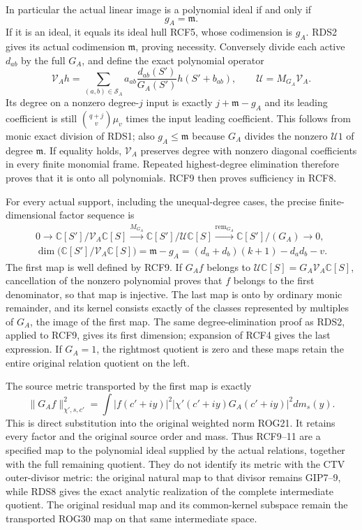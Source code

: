 \documentclass[11pt,a4paper]{article}
\begin{document}
In particular the actual linear image is a polynomial ideal
if and only if
\[
                         g_A=\mathfrak m.
 \tag{RCF8}
\]
If it is an ideal, it equals its ideal hull RCF5, whose
codimension is $g_A$. RDS2 gives its actual codimension
$\mathfrak m$, proving necessity. Conversely divide each
active $d_{ab}$ by the full $G_A$, and define the exact
polynomial operator
\[
 \mathcal V_Ah=\sum_{(a,b)\in\mathcal S_A}
         a_{ab}\frac{d_{ab}(S')}{G_A(S')}h(S'+b_{ab}),
       \qquad \mathcal U=M_{G_A}\mathcal V_A.
 \tag{RCF9}
\]
Its degree on a nonzero degree-$j$ input is exactly
$j+\mathfrak m-g_A$ and its leading coefficient is still
$\binom{q+j}{v}\mu_v$ times the input leading coefficient.
This follows from monic exact division of RDS1; also
$g_A\le\mathfrak m$ because $G_A$ divides the nonzero
$\mathcal U1$ of degree $\mathfrak m$. If equality holds,
$\mathcal V_A$ preserves degree with nonzero diagonal
coefficients in every finite monomial frame. Repeated
highest-degree elimination therefore proves that it is
onto all polynomials. RCF9 then proves sufficiency in RCF8.

For every actual support, including the unequal-degree cases,
the precise finite-dimensional factor sequence is
\[
 \begin{gathered}
 0\longrightarrow
 \mathbb C[S']/\mathcal V_A\mathbb C[S]
 \xrightarrow{M_{G_A}}
 \mathbb C[S']/\mathcal U\mathbb C[S]
 \xrightarrow{\operatorname{rem}_{G_A}}
 \mathbb C[S']/(G_A)\longrightarrow0,\\
 \dim\bigl(\mathbb C[S']/\mathcal V_A\mathbb C[S]\bigr)
    =\mathfrak m-g_A
    =(d_a+d_b)(k+1)-d_ad_b-v.
 \end{gathered}\tag{RCF10}
\]
The first map is well defined by RCF9. If $G_Af$ belongs
to $\mathcal U\mathbb C[S]=G_A\mathcal V_A\mathbb C[S]$,
cancellation of the nonzero polynomial proves that $f$
belongs to the first denominator, so that map is injective.
The last map is onto by ordinary monic remainder, and its
kernel consists exactly of the classes represented by
multiples of $G_A$, the image of the first map. The same
degree-elimination proof as RDS2, applied to RCF9, gives its
first dimension; expansion of RCF4 gives the last expression.
If $G_A=1$, the rightmost quotient is zero and these maps
retain the entire original relation quotient on the left.

The source metric transported by the first map is exactly
\[
 \|G_Af\|_{\chi',s,c'}^2
      =\int|f(c'+iy)|^2|\chi'(c'+iy)G_A(c'+iy)|^2dm_s(y).
 \tag{RCF11}
\]
This is direct substitution into the original weighted norm
ROG21. It retains every factor and the original source order
and mass. Thus RCF9--11 are a specified map to the polynomial
ideal supplied by the actual relations, together with the
full remaining quotient. They do not identify its metric
with the CTV outer-divisor metric: the original natural map
to that divisor remains GIP7--9, while RDS8 gives the exact
analytic realization of the complete intermediate quotient.
The original residual map and its common-kernel subspace
remain the transported ROG30 map on that same intermediate
space.
\end{document}

